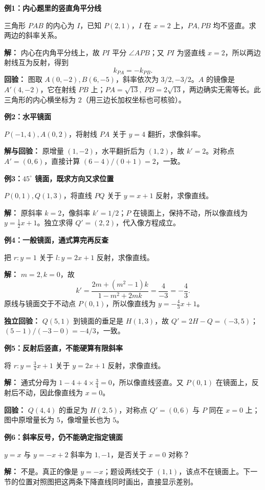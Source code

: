 \clearpage
\begin{examplebox}
\textbf{例1：内心题里的竖直角平分线}

三角形 $PAB$ 的内心为 $I$，已知 $P(2,1)$，$I$ 在 $x=2$ 上，$PA,PB$ 均不竖直。求两边的斜率关系。
\begin{center}

\end{center}
\textbf{解：} 内心在内角平分线上，故 $PI$ 平分 $\angle APB$；又 $PI$ 为竖直线 $x=2$，所以两边射线互为反射，得到
\[
\boxed{k_{PA}=-k_{PB}}.
\]
\textbf{回验：} 图取 $A(0,-2),B(6,-5)$，斜率依次为 $3/2,-3/2$。$A$ 的镜像是 $A'(4,-2)$，它在射线 $PB$ 上；$PA=\sqrt{13},\ PB=2\sqrt{13}$，两边确实无需等长。此三角形的内心横坐标为 $2$（用三边长加权坐标也可核验）。

\medskip
\textbf{例2：水平镜面}

$P(-1,4),A(0,2)$，将射线 $PA$ 关于 $y=4$ 翻折，求像斜率。

\textbf{解与回验：} 原增量 $(1,-2)$，水平翻折后为 $(1,2)$，故 $k'=2$。对称点 $A'=(0,6)$，直接计算 $(6-4)/(0+1)=2$，一致。
\end{examplebox}

\clearpage
\begin{examplebox}
\textbf{例3：$45^\circ$ 镜面，既求方向又求位置}

$P(0,1),Q(1,3)$，将直线 $PQ$ 关于 $y=x+1$ 反射，求像直线。
\begin{center}

\end{center}
\textbf{解：} 原斜率 $k=2$，像斜率 $k'=1/2$；$P$ 在镜面上，保持不动，所以像直线为 $\boxed{y=\frac12x+1}$。独立求得 $Q'=(2,2)$，代入像方程成立。

\medskip
\textbf{例4：一般镜面，通式算完再反查}

把 $r:y=1$ 关于 $l:y=2x+1$ 反射，求像直线。

\textbf{解：} $m=2,k=0$，故
\[
k'=\frac{2m+(m^2-1)k}{1-m^2+2mk}=\frac4{-3}=-\frac43.
\]
原线与镜面交于不动点 $P(0,1)$，所以像直线为 $\boxed{y=-\frac43x+1}$。

\textbf{独立回验：} $Q(5,1)$ 到镜面的垂足是 $H(1,3)$，故 $Q'=2H-Q=(-3,5)$；$(5-1)/(-3-0)=-4/3$，一致。
\end{examplebox}

\clearpage
\begin{examplebox}
\textbf{例5：反射后竖直，不能硬算有限斜率}

将 $r:y=\frac34x+1$ 关于 $y=2x+1$ 反射，求像直线。
\begin{center}

\end{center}
\textbf{解：} 通式分母为 $1-4+4\times\frac34=0$，所以像直线竖直。又 $P(0,1)$ 在镜面上，反射后不动，因此像直线为 $\boxed{x=0}$。

\textbf{回验：} $Q(4,4)$ 的垂足为 $H(2,5)$，对称点 $Q'=(0,6)$ 与 $P$ 同在 $x=0$ 上；图中原增量长为 $5$，像增量长也为 $5$。

\medskip
\textbf{例6：斜率反号，仍不能确定指定镜面}

$y=x$ 与 $y=-x+2$ 斜率为 $1,-1$，是否关于 $x=0$ 对称？

\textbf{解：} 不是。真正的像是 $y=-x$；题设两线交于 $(1,1)$，该点不在镜面上。下一节的位置对照图把这两条下降直线同时画出，直接显示差别。
\end{examplebox}
